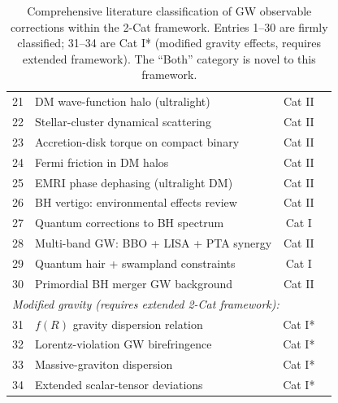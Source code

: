 \documentclass[11pt]{article}
\begin{document}
\begin{table}[htbp]
\begin{tabular}{c p{5.5cm} c c}
21 & DM wave-function halo (ultralight) & Cat II & \cite{Arvanitaki:2010} \\
22 & Stellar-cluster dynamical scattering & Cat II & \cite{Hopman:2004} \\
23 & Accretion-disk torque on compact binary & Cat II & \cite{Frank:2021} \\
24 & Fermi friction in DM halos & Cat II & \cite{Fermi:2016} \\
25 & EMRI phase dephasing (ultralight DM) & Cat II & \cite{Tang:2018} \\
26 & BH vertigo: environmental effects review & Cat II & \cite{Barausse:2020} \\
27 & Quantum corrections to BH spectrum & Cat I & \cite{Ghosh:2020} \\
28 & Multi-band GW: BBO + LISA + PTA synergy & Cat II & \cite{Baker:2019,Miao:2019} \\
29 & Quantum hair + swampland constraints & Cat I & \cite{Dvali:2017,Coley:2018} \\
30 & Primordial BH merger GW background & Cat II & \cite{Baryakhtar:2017} \\
\midrule
\multicolumn{4}{l}{\textit{Modified gravity (requires extended 2-Cat framework):}} \\
\midrule
31 & $f(R)$ gravity dispersion relation & Cat I* & \cite{Will:2014} \\
32 & Lorentz-violation GW birefringence & Cat I* & \cite{Kostelecky:2011} \\
33 & Massive-graviton dispersion & Cat I* & \cite{Abbott:2016} \\
34 & Extended scalar-tensor deviations & Cat I* & \cite{Yunes:2013} \\
\bottomrule
\end{tabular}
\caption{Comprehensive literature classification of GW observable corrections within the 2-Cat framework. Entries 1--30 are firmly classified; 31--34 are Cat I* (modified gravity effects, requires extended framework). The ``Both'' category is novel to this framework.}
\label{tab:lit-table}
\end{table}
\end{document}
